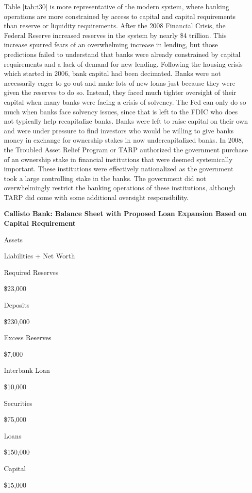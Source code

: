 \documentclass[
]{book}
\begin{document}
Table \ref{tab:t30} is more representative of the modern system, where banking operations are more constrained by access to capital and capital requirements than reserve or liquidity requirements. After the 2008 Financial Crisis, the Federal Reserve increased reserves in the system by nearly \$4 trillion. This increase spurred fears of an overwhelming increase in lending, but those predictions failed to understand that banks were already constrained by capital requirements and a lack of demand for new lending. Following the housing crisis which started in 2006, bank capital had been decimated. Banks were not necessarily eager to go out and make lots of new loans just because they were given the reserves to do so. Instead, they faced much tighter oversight of their capital when many banks were facing a crisis of solvency. The Fed can only do so much when banks face solvency issues, since that is left to the FDIC who does not typically help recapitalize banks. Banks were left to raise capital on their own and were under pressure to find investors who would be willing to give banks money in exchange for ownership stakes in now undercapitalized banks. In 2008, the Troubled Asset Relief Program or TARP authorized the government purchase of an ownership stake in financial institutions that were deemed systemically important. These institutions were effectively nationalized as the government took a large controlling stake in the banks. The government did not overwhelmingly restrict the banking operations of these institutions, although TARP did come with some additional oversight responsibility.

\label{tab:t30}\textbf{Callisto Bank: Balance Sheet with Proposed Loan Expansion Based on Capital Requirement}

Assets

Liabilities + Net Worth

Required Reserves

\$23,000

Deposits

\$230,000

Excess Reserves

\$7,000

Interbank Loan

\$10,000

Securities

\$75,000

Loans

\$150,000

Capital

\$15,000
\end{document}
